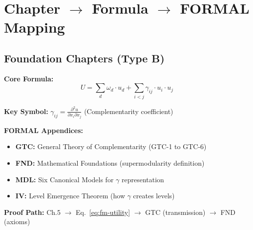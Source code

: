 \section{Chapter $\rightarrow$ Formula $\rightarrow$ FORMAL Mapping}
\label{sec:fm-mapping}

\subsection{Foundation Chapters (Type B)}

\begin{tcolorbox}[colback=gray!3!white, colframe=gray!60!black,
    title=\textbf{Chapter 5: Complementarity (HOW)}]

\textbf{Core Formula:}
\begin{equation}
U = \sum_{d} \omega_d \cdot u_d + \sum_{i < j} \gamma_{ij} \cdot u_i \cdot u_j
\label{eq:fm-utility}
\end{equation}

\textbf{Key Symbol:} $\gamma_{ij} = \frac{\partial^2 u}{\partial x_i \partial x_j}$ (Complementarity coefficient)

\textbf{FORMAL Appendices:}
\begin{itemize}[nosep]
    \item \textbf{GTC:} General Theory of Complementarity (GTC-1 to GTC-6)
    \item \textbf{FND:} Mathematical Foundations (supermodularity definition)
    \item \textbf{MDL:} Six Canonical Models for $\gamma$ representation
    \item \textbf{IV:} Level Emergence Theorem (how $\gamma$ creates levels)
\end{itemize}

\textbf{Proof Path:} Ch.5 $\rightarrow$ Eq.~\ref{eq:fm-utility} $\rightarrow$ GTC (transmission) $\rightarrow$ FND (axioms)

\end{tcolorbox}

